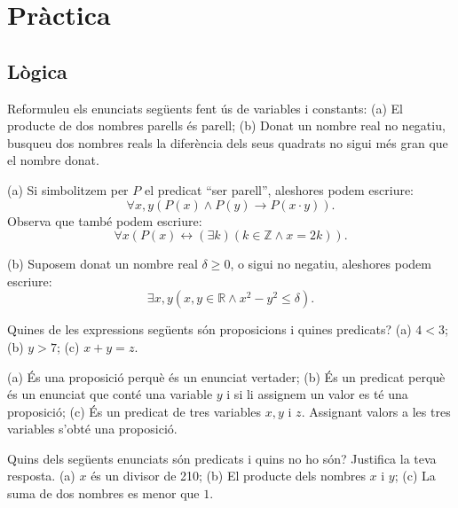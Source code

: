 \chapter{Pràctica}
\label{cap:practica}

\section{L\`{o}gica}

\begin{exercici}
Reformuleu els enunciats seg\"{u}ents fent \'{u}s de variables i constants:
(a) El producte de dos nombres parells \'{e}s parell; (b) Donat un nombre real
no negatiu, busqueu dos nombres reals la difer\`{e}ncia dels seus quadrats no
sigui m\'{e}s gran que el nombre donat.
\end{exercici}

\begin{solucio}
(a) Si simbolitzem per $P$ el predicat \textquotedblleft ser
parell\textquotedblright, aleshores podem escriure:%
\[
\forall x,y\left(  P\left(  x\right)  \wedge P\left(  y\right)
\longrightarrow P\left(  x\cdot y\right)  \right)  \text{.}%
\]
Observa que tamb\'{e} podem escriure:%
\[
\forall x\left(  P\left(  x\right)  \longleftrightarrow\left(  \exists
k\right)  \left(  k\in\mathbb{Z}\wedge x=2k\right)  \right)  \text{.}%
\]


(b) Suposem donat un nombre real $\delta\geq0$, o sigui no negatiu, aleshores
podem escriure:%
\[
\exists x,y\left(  x,y\in\mathbb{R}\wedge x^{2}-y^{2}\leq\delta\right)
\text{.}%
\]

\end{solucio}

\begin{exercici}
Quines de les expressions seg\"{u}ents s\'{o}n proposicions i quines
predicats? (a) $4<3$; (b) $y>7$; (c) $x+y=z$.
\end{exercici}

\begin{solucio}
(a) \'{E}s una proposici\'{o} perqu\`{e} \'{e}s un enunciat vertader; (b)
\'{E}s un predicat perqu\`{e} \'{e}s un enunciat que cont\'{e} una variable
$y$ i si li assignem un valor es t\'{e} una proposici\'{o}; (c) \'{E}s un
predicat de tres variables $x,y$ i $z$. Assignant valors a les tres variables
s'obt\'{e} una proposici\'{o}.
\end{solucio}

\begin{exercici}
Quins dels seg\"{u}ents enunciats s\'{o}n predicats i quins no ho s\'{o}n?
Justifica la teva resposta. (a) $x$ \'{e}s un divisor de 210; (b) El producte
dels nombres $x$ i $y$; (c) La suma de dos nombres es menor que $1$.
\end{exercici}

